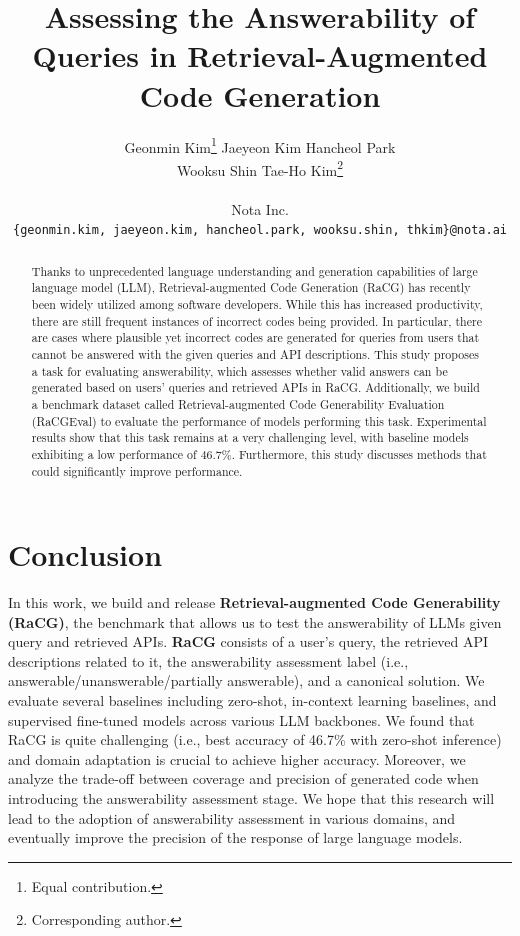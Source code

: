 \documentclass[11pt]{article}
\title{Assessing the Answerability of Queries in Retrieval-Augmented \\ Code Generation}
\author{
\begin{tabular}{@{}c c}
Geonmin Kim\thanks{Equal contribution.}\quad
Jaeyeon Kim\footnotemark[1]\quad
Hancheol Park\quad\\
Wooksu Shin\quad
Tae-Ho Kim\thanks{Corresponding author.}\vspace{6pt} 
\end{tabular}\\
Nota Inc.\\
\texttt{\{geonmin.kim, jaeyeon.kim, hancheol.park, wooksu.shin, thkim\}@nota.ai}
}
\begin{document}
\maketitle
\begin{abstract}
Thanks to unprecedented language understanding and generation capabilities of large language model (LLM), Retrieval-augmented Code Generation (RaCG) has recently been widely utilized among software developers. While this has increased productivity, there are still frequent instances of incorrect codes being provided. In particular, there are cases where plausible yet incorrect codes are generated for queries from users that cannot be answered with the given queries and API descriptions. This study proposes a task for evaluating answerability, which assesses whether valid answers can be generated based on users' queries and retrieved APIs in RaCG. Additionally, we build a benchmark dataset called Retrieval-augmented Code Generability Evaluation (RaCGEval) to evaluate the performance of models performing this task. Experimental results show that this task remains at a very challenging level, with baseline models exhibiting a low performance of 46.7\%. Furthermore, this study discusses methods that could significantly improve performance.

\end{abstract}







\section{Conclusion}
In this work, we build and release \textbf{Retrieval-augmented Code Generability (RaCG)}, the benchmark that allows us to test the answerability of LLMs given query and retrieved APIs. \textbf{RaCG} consists of a user's query, the retrieved API descriptions related to it, the answerability assessment label (i.e., answerable/unanswerable/partially answerable), and a canonical solution. We evaluate several baselines including zero-shot, in-context learning baselines, and supervised fine-tuned models across various LLM backbones. We found that RaCG is quite challenging (i.e., best accuracy of 46.7\% with zero-shot inference) and domain adaptation is crucial to achieve higher accuracy. Moreover, we analyze the trade-off between coverage and precision of generated code when introducing the answerability assessment stage. We hope that this research will lead to the adoption of answerability assessment in various domains, and eventually improve the precision of the response of large language models.
\end{document}
